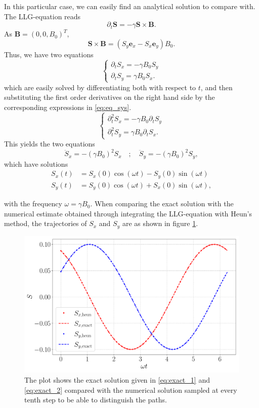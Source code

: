 In this particular case, we can easily find an analytical solution to compare with. The LLG-equation reads
\[
	\partial_t \mathbf{S} = -\gamma \mathbf{S} \times \mathbf{B}.
\]
As $\mathbf{B} = (0,0,B_0)^T$,
\[
	\mathbf{S} \times \mathbf{B} = (S_y \mathbf{e}_x - S_x \mathbf{e}_y) B_0.
\]
Thus, we have two equations 
\begin{equation}\label{eq:eq_sys}
	\begin{cases}
		\partial_t S_x = -\gamma B_0 S_y \\
		\partial_t S_y = \gamma B_0S_x.
	\end{cases}
\end{equation}
which are easily solved by differentiating both with respect to $t$, and then substituting the first order derivatives on the right hand side by the corresponding expressions in \ref{eq:eq_sys}.
\begin{equation}
	\begin{cases}
		\partial^2_t S_x = -\gamma B_0 \partial_t S_y  \\
		\partial^2_t S_y = \gamma B_0 \partial_t S_x.
	\end{cases}
\end{equation}
This yields the two equations
\begin{equation}
	\ddot{S}_x = - \left( \gamma B_0 \right)^2 S_x \quad;\quad \ddot{S}_y = - \left( \gamma B_0 \right)^2 S_y, 
\end{equation}
which have solutions 
\begin{align}
	S_x(t) &= S_x(0) \cos{(\omega t)} - S_y(0) \sin{(\omega t)} \label{eq:exact_1} \\
	S_y(t) &= S_y(0) \cos{(\omega t)} + S_x(0) \sin{(\omega t)} \label{eq:exact_2},
\end{align}

with the frequency $\omega = \gamma B_0$. When comparing the exact solution with the numerical estimate obtained through integrating the LLG-equation with Heun's method, the trajectories of $S_x$ and $S_y$ are as shown in figure \ref{fig:comp}.

\begin{figure}[htb]
	\centering
	\includegraphics[width=0.8\columnwidth]{../fig/comparison.pdf}
	\caption{The plot shows the exact solution given in \eqref{eq:exact_1} and \eqref{eq:exact_2} compared with the numerical solution sampled at every tenth step to be able to distinguish the paths.}
	\label{fig:comp}
\end{figure} 

